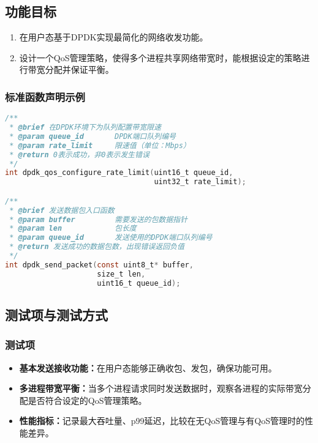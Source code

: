 \begin{enumerate}
\subsection{功能目标}
\begin{enumerate}
    \item 在用户态基于DPDK实现最简化的网络收发功能。
    \item 设计一个QoS管理策略，使得多个进程共享网络带宽时，能根据设定的策略进行带宽分配并保证平衡。
\end{enumerate}

\subsubsection{标准函数声明示例}
\begin{lstlisting}[language=C, caption={示例：DPDK QoS管理接口}]
/**
 * @brief 在DPDK环境下为队列配置带宽限速
 * @param queue_id       DPDK端口队列编号
 * @param rate_limit     限速值（单位：Mbps）
 * @return 0表示成功，非0表示发生错误
 */
int dpdk_qos_configure_rate_limit(uint16_t queue_id, 
                                  uint32_t rate_limit);

/**
 * @brief 发送数据包入口函数
 * @param buffer         需要发送的包数据指针
 * @param len            包长度
 * @param queue_id       发送使用的DPDK端口队列编号
 * @return 发送成功的数据包数，出现错误返回负值
 */
int dpdk_send_packet(const uint8_t* buffer, 
                     size_t len, 
                     uint16_t queue_id);
\end{lstlisting}

\subsection{测试项与测试方式}
\subsubsection{测试项}
\begin{itemize}
    \item \textbf{基本发送接收功能：}在用户态能够正确收包、发包，确保功能可用。
    \item \textbf{多进程带宽平衡：}当多个进程请求同时发送数据时，观察各进程的实际带宽分配是否符合设定的QoS管理策略。
    \item \textbf{性能指标：}记录最大吞吐量、p99延迟，比较在无QoS管理与有QoS管理时的性能差异。
\end{itemize}


\end{enumerate}
